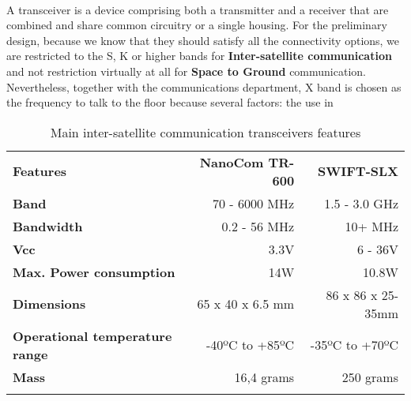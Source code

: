 \paragraph{} A transceiver is a device comprising both a transmitter and a receiver that are combined and share common circuitry or a single housing. For the preliminary design, because we know that they should satisfy all the connectivity options, we are restricted to the S, K or higher bands for \textbf{Inter-satellite communication} and not restriction virtually at all for \textbf{Space to Ground} communication. Nevertheless, together with the communications department, X band is chosen as the frequency to talk to the floor because several factors: the use in 
\begin{longtable}{| l | r | r |}
	
	\hline
	\rowcolor[gray]{0.60} \multicolumn{3}{|c|}{\textbf{Transceivers options - Inter-satellite comm.(S band)}} \\
	\hline
	
	\hline
	\rowcolor[gray]{0.75}	\textbf{Features} &  \textbf{NanoCom TR-600} & \textbf{SWIFT-SLX} \\
	\hline
	
	\cellcolor[gray]{0.85} \textbf{Band} & 70 - 6000 MHz  & 1.5 - 3.0 GHz\\
	\cellcolor[gray]{0.85} \textbf{Bandwidth} & 0.2 - 56 MHz& 10+ MHz\\
	\cellcolor[gray]{0.85} \textbf{Vcc} & 3.3V&6 - 36V \\
	\cellcolor[gray]{0.85} \textbf{Max. Power consumption} & 14W& 10.8W\\
	\cellcolor[gray]{0.85} \textbf{Dimensions} & 65 x 40 x 6.5 mm & 86 x 86 x 25-35mm\\
	\cellcolor[gray]{0.85} \textbf{Operational temperature range} & -40ºC to +85ºC & -35ºC to +70ºC\\
	\cellcolor[gray]{0.85} \textbf{Mass} & 16,4 grams&250 grams \\
	\hline
	
	\caption{Main inter-satellite communication transceivers features}
	\label{TransceiversSband}
	
\end{longtable}


